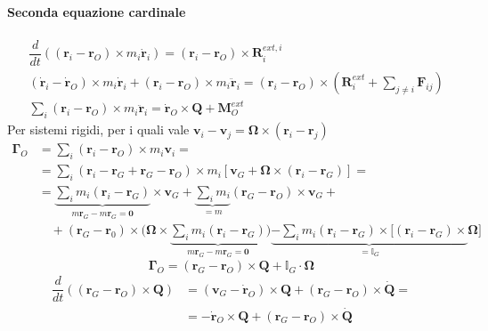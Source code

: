 \paragraph{Seconda equazione cardinale}
\begin{equation}
\begin{aligned}
    & \dfrac{d}{dt} \left( (\mathbf{r}_i-\mathbf{r}_O) \times m_i \dot{\mathbf{r}}_i \right) = (\mathbf{r}_i-\mathbf{r}_O) \times \mathbf{R}^{ext,i}_i \\
    & ( \dot{\mathbf{r}}_i - \dot{\mathbf{r}}_O ) \times m_i \dot{\mathbf{r}}_i + (\mathbf{r}_i-\mathbf{r}_O) \times m_i \ddot{\mathbf{r}}_i =  (\mathbf{r}_i-\mathbf{r}_O) \times \left( \mathbf{R}^{ext}_i + \sum_{j\ne i} \mathbf{F}_{ij} \right) \\
    & \sum_i (\mathbf{r}_i-\mathbf{r}_O) \times m_i \ddot{\mathbf{r}}_i = \dot{\mathbf{r}}_O \times \mathbf{Q} + \mathbf{M}_O^{ext}
\end{aligned}
\end{equation}
%
Per sistemi rigidi, per i quali vale $\mathbf{v}_i - \mathbf{v}_j = \mathbf{\Omega} \times (\mathbf{r}_i - \mathbf{r}_j)$
\begin{equation}
\begin{aligned}
    \mathbf{\Gamma}_O & = \sum_{i} \left( \mathbf{r}_i - \mathbf{r}_O \right) \times m_i \mathbf{v}_i = \\
    & = \sum_i \left( \mathbf{r}_i - \mathbf{r}_G + \mathbf{r}_G - \mathbf{r}_O \right) \times m_i \left[ \mathbf{v}_G + \mathbf{\Omega} \times (\mathbf{r}_i - \mathbf{r}_G) \right] = \\
    & = \underbrace{\sum_i m_i (\mathbf{r}_i - \mathbf{r}_G)}_{m \mathbf{r}_G - m \mathbf{r}_G=\mathbf{0}} \times \mathbf{v}_G +
        \underbrace{\sum_i m_i}_{=m} (\mathbf{r}_G - \mathbf{r}_O) \times \mathbf{v}_G + \\
    & \quad + (\mathbf{r}_G - \mathbf{r}_0) \times \bigg( \mathbf{\Omega} \times \underbrace{\sum_i m_i (\mathbf{r}_i - \mathbf{r}_G)}_{m \mathbf{r}_G - m \mathbf{r}_G=\mathbf{0}} \bigg)
    \underbrace{- \sum_i m_i (\mathbf{r}_i - \mathbf{r}_G ) \times [ (\mathbf{r}_i - \mathbf{r}_G ) \times }_{=\mathbb{I}_G} \mathbf{\Omega} ]
\end{aligned}
\end{equation}
\begin{equation}
    \mathbf{\Gamma}_O = (\mathbf{r}_G - \mathbf{r}_O) \times \mathbf{Q} + \mathbb{I}_G \cdot \mathbf{\Omega}
\end{equation}
\begin{equation}
\begin{aligned}
    \dfrac{d}{dt} \left( (\mathbf{r}_G - \mathbf{r}_O) \times \mathbf{Q}  \right) & = ( \mathbf{v}_G - \dot{\mathbf{r}}_O ) \times \mathbf{Q} + (\mathbf{r}_G - \mathbf{r}_O) \times \dot{\mathbf{Q}} = \\
    & = - \dot{\mathbf{r}}_O \times \mathbf{Q} + (\mathbf{r}_G - \mathbf{r}_O) \times \dot{\mathbf{Q}}
\end{aligned}
\end{equation}
